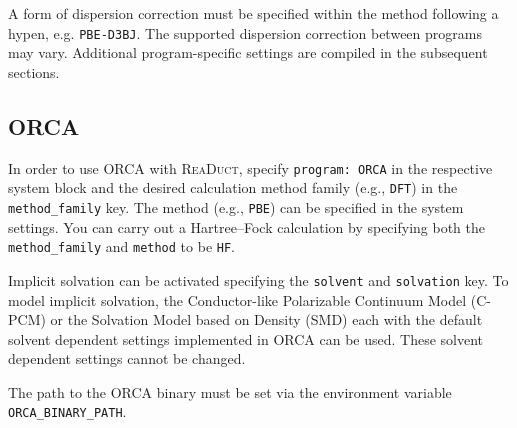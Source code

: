 \documentclass[]{tufte-book}
\begin{document}
A form of dispersion correction must be specified within the method following a hypen, e.g. \texttt{PBE-D3BJ}. The supported dispersion correction between programs may vary. Additional program-specific settings are compiled in the subsequent sections.

\subsection{\textsc{ORCA}}

In order to use \textsc{ORCA} with \textsc{ReaDuct}, specify \texttt{program: ORCA} in the respective system block and the desired
calculation method family (e.g., \texttt{DFT}) in the \texttt{method\_family} key.
The method (e.g., \texttt{PBE}) can be specified in the system settings.
You can carry out a Hartree--Fock calculation by specifying both the \texttt{method\_family} and \texttt{method} to be \texttt{HF}.

Implicit solvation can be activated specifying the \texttt{solvent} and \texttt{solvation} key.
To model implicit solvation, the Conductor-like Polarizable Continuum Model\cite{cpcm} (C-PCM) or the Solvation Model based on Density\cite{smd} (SMD) each with the default solvent dependent settings implemented in \textsc{ORCA} can be used.
These solvent dependent settings cannot be changed.

The path to the \textsc{ORCA} binary must be set via the environment variable \texttt{ORCA\_BINARY\_PATH}.
\end{document}
